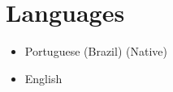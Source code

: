 \documentclass[a4paper,10pt]{article}
\begin{document}

\section{Languages}
    \begin{itemize}
        \item Portuguese (Brazil) (Native)
        \item English
    \end{itemize}
\end{document}
